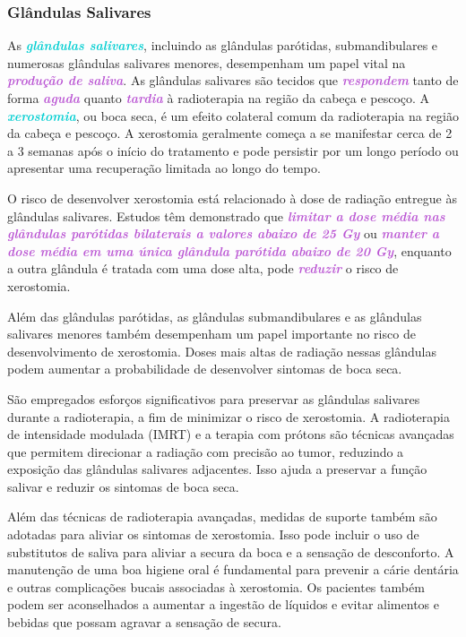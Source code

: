 \documentclass[11pt,a4paper]{article}
\begin{document}
\subsubsection*{Glândulas Salivares}

	As \textcolor{DarkTurquoise}{\textbf{\textit{glândulas salivares}}}, incluindo as glândulas parótidas, submandibulares e numerosas glândulas salivares menores, desempenham um papel vital na \textcolor{MediumOrchid}{\textbf{\textit{produção de saliva}}}. As glândulas salivares são tecidos que \textcolor{MediumOrchid}{\textbf{\textit{respondem}}} tanto de forma \textcolor{MediumOrchid}{\textbf{\textit{aguda}}} quanto \textcolor{MediumOrchid}{\textbf{\textit{tardia}}} à radioterapia na região da cabeça e pescoço. A \textcolor{DarkTurquoise}{\textbf{\textit{xerostomia}}}, ou boca seca, é um efeito colateral comum  da radioterapia na região da cabeça e pescoço. A xerostomia geralmente começa a se manifestar cerca de 2 a 3 semanas após o início do tratamento e pode persistir por um longo período ou apresentar uma recuperação limitada ao longo do tempo.

	O risco de desenvolver xerostomia está relacionado à dose de radiação entregue às glândulas salivares. Estudos têm demonstrado que \textcolor{MediumOrchid}{\textbf{\textit{limitar a dose média nas glândulas parótidas bilaterais a valores abaixo de 25 Gy}}} ou\textcolor{MediumOrchid}{\textbf{\textit{ manter a dose média em uma única glândula parótida abaixo de 20 Gy}}}, enquanto a outra glândula é tratada com uma dose alta, pode \textcolor{MediumOrchid}{\textbf{\textit{reduzir}}} o risco de xerostomia.

	Além das glândulas parótidas, as glândulas submandibulares e as glândulas salivares menores também desempenham um papel importante no risco de desenvolvimento de xerostomia. Doses mais altas de radiação nessas glândulas podem aumentar a probabilidade de desenvolver sintomas de boca seca.

	São empregados esforços significativos para preservar as glândulas salivares durante a radioterapia, a fim de minimizar o risco de xerostomia. A radioterapia de intensidade modulada (IMRT) e a terapia com prótons são técnicas avançadas que permitem direcionar a radiação com precisão ao tumor, reduzindo a exposição das glândulas salivares adjacentes. Isso ajuda a preservar a função salivar e reduzir os sintomas de boca seca.

	Além das técnicas de radioterapia avançadas, medidas de suporte também são adotadas para aliviar os sintomas de xerostomia. Isso pode incluir o uso de substitutos de saliva para aliviar a secura da boca e a sensação de desconforto. A manutenção de uma boa higiene oral é fundamental para prevenir a cárie dentária e outras complicações bucais associadas à xerostomia. Os pacientes também podem ser aconselhados a aumentar a ingestão de líquidos e evitar alimentos e bebidas que possam agravar a sensação de secura.
\end{document}
